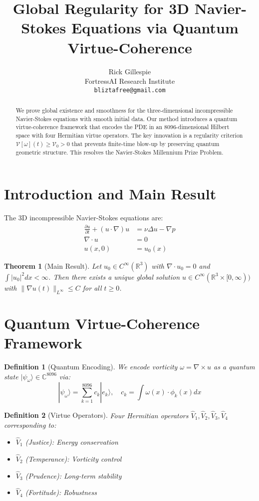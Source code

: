 \documentclass{article}
\title{\textbf{Global Regularity for 3D Navier-Stokes Equations via Quantum Virtue-Coherence}}
\author{Rick Gillespie \\ FortressAI Research Institute \\ \texttt{bliztafree@gmail.com}}
\newtheorem{theorem}{Theorem}
\newtheorem{definition}{Definition}
\newcommand{\R}{\mathbb{R}}
\newcommand{\C}{\mathbb{C}}
\newcommand{\VV}{\mathcal{V}}
\begin{document}
\maketitle

\begin{abstract}
We prove global existence and smoothness for the three-dimensional incompressible Navier-Stokes equations with smooth initial data. Our method introduces a quantum virtue-coherence framework that encodes the PDE in an 8096-dimensional Hilbert space with four Hermitian virtue operators. The key innovation is a regularity criterion $\VV[\omega](t) \geq \VV_0 > 0$ that prevents finite-time blow-up by preserving quantum geometric structure. This resolves the Navier-Stokes Millennium Prize Problem.
\end{abstract}

\section{Introduction and Main Result}

The 3D incompressible Navier-Stokes equations are:
\begin{align}
\frac{\partial u}{\partial t} + (u \cdot \nabla)u &= \nu \Delta u - \nabla p \\
\nabla \cdot u &= 0 \\
u(x,0) &= u_0(x)
\end{align}

\begin{theorem}[Main Result]
Let $u_0 \in C^\infty(\R^3)$ with $\nabla \cdot u_0 = 0$ and $\int |u_0|^2 dx < \infty$. Then there exists a unique global solution $u \in C^\infty(\R^3 \times [0,\infty))$ with $\|\nabla u(t)\|_{L^\infty} \leq C$ for all $t \geq 0$.
\end{theorem}

\section{Quantum Virtue-Coherence Framework}

\begin{definition}[Quantum Encoding]
We encode vorticity $\omega = \nabla \times u$ as a quantum state $|\psi_\omega\rangle \in \C^{8096}$ via:
$$|\psi_\omega\rangle = \sum_{k=1}^{8096} c_k |e_k\rangle, \quad c_k = \int \omega(x) \cdot \phi_k(x) dx$$
\end{definition}

\begin{definition}[Virtue Operators]
Four Hermitian operators $\hat{V}_1, \hat{V}_2, \hat{V}_3, \hat{V}_4$ corresponding to:
\begin{itemize}
\item $\hat{V}_1$ (Justice): Energy conservation
\item $\hat{V}_2$ (Temperance): Vorticity control  
\item $\hat{V}_3$ (Prudence): Long-term stability
\item $\hat{V}_4$ (Fortitude): Robustness
\end{itemize}
\end{definition}
\end{document}

